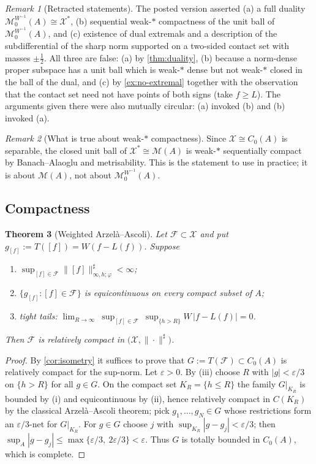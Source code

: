 \documentclass[11pt,a4paper]{article}
\numberwithin{equation}{section}
\theoremstyle{plain}
\newtheorem{theorem}{Theorem}[section]
\theoremstyle{definition}
\theoremstyle{remark}
\newtheorem{remark}[theorem]{Remark}
\newcommand{\Cz}{C_0}
\newcommand{\Msp}{\mathcal{M}}
\newcommand{\Xdec}{\mathcal{X}}
\begin{document}
\begin{remark}[Retracted statements]\label{rem:retracted-duality}
The posted version asserted (a) a full duality $\Msp_0^{W^{-1}}(A)\cong\Xdec^{\ast}$,
(b) sequential weak-$*$ compactness of the unit ball of $\Msp_0^{W^{-1}}(A)$, and (c)
existence of dual extremals and a description of the subdifferential of the sharp norm
supported on a two-sided contact set with masses $\pm\tfrac12$. All three are false:
(a) by \cref{thm:duality}, (b) because a norm-dense proper subspace has a unit ball which
is weak-$*$ dense but not weak-$*$ closed in the ball of the dual, and (c) by
\cref{ex:no-extremal} together with the observation that the contact set need not have
points of both signs (take $f\ge L$). The arguments given there were also mutually
circular: (a) invoked (b) and (b) invoked (a).
\end{remark}

\begin{remark}[What is true about weak-$*$ compactness]
Since $\Xdec\cong\Cz(A)$ is separable, the closed unit ball of $\Xdec^{\ast}\cong\Msp(A)$
is weak-$*$ sequentially compact by Banach--Alaoglu and metrisability. This is the
statement to use in practice; it is about $\Msp(A)$, not about $\Msp_0^{W^{-1}}(A)$.
\end{remark}

\subsection{Compactness}

\begin{theorem}[Weighted Arzel\`a--Ascoli]\label{thm:AA}
Let $\mathcal{F}\subset\Xdec$ and put $g_{[f]}:=T([f])=W(f-L(f))$. Suppose
\begin{enumerate}
\item[(i)] $\sup_{[f]\in\mathcal{F}}\|[f]\|^{\sharp}_{\infty,h;\varphi}<\infty$;
\item[(ii)] $\{g_{[f]}:[f]\in\mathcal{F}\}$ is equicontinuous on every compact subset of $A$;
\item[(iii)] tight tails: $\displaystyle\lim_{R\to\infty}\ \sup_{[f]\in\mathcal{F}}\ \sup_{\{h>R\}}W\,|f-L(f)|=0$.
\end{enumerate}
Then $\mathcal{F}$ is relatively compact in $\bigl(\Xdec,\|\cdot\|^{\sharp}\bigr)$.
\end{theorem}

\begin{proof}
By \cref{cor:isometry} it suffices to prove that $G:=T(\mathcal{F})\subset\Cz(A)$ is
relatively compact for the sup-norm. Let $\varepsilon>0$. By (iii) choose $R$ with
$|g|<\varepsilon/3$ on $\{h>R\}$ for all $g\in G$. On the compact set $K_R=\{h\le R\}$ the
family $G|_{K_R}$ is bounded by (i) and equicontinuous by (ii), hence relatively compact in
$C(K_R)$ by the classical Arzel\`a--Ascoli theorem; pick $g_1,\dots,g_N\in G$ whose
restrictions form an $\varepsilon/3$-net for $G|_{K_R}$. For $g\in G$ choose $j$ with
$\sup_{K_R}|g-g_j|<\varepsilon/3$; then
$\sup_A|g-g_j|\le\max\{\varepsilon/3,\ 2\varepsilon/3\}<\varepsilon$. Thus $G$ is totally
bounded in $\Cz(A)$, which is complete.
\end{proof}
\end{document}
